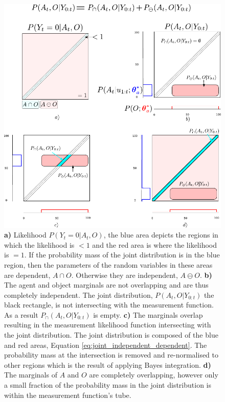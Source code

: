  \begin{figure}
 \centering
  \includegraphics[width=\textwidth]{./ch5-MLMF/Figures/Figure7.pdf}
  \caption{
  \textbf{a)} Likelihood $P(Y_t=0|A_t,O)$, the blue area depicts the regions in which the likelihood is $<1$ 
  and the red area is where the likelihood is $=1$. If the probability mass of the joint distribution 
  is in the blue region, then the parameters of the random variables in these areas are dependent, $A \cap O$.
  Otherwise they are independent, $A \ominus O$.  
   \textbf{b)} The agent and object marginals are not overlapping and are thus completely independent. The joint distribution, 
   $P(A_t,O|Y_{0:t})$ the black rectangle,  is not intersecting with the measurement function. As a result $P_{\cap}(A_t,O|Y_{0:t})$
   is empty.
 \textbf{c)} The marginals overlap resulting in the measurement likelihood function intersecting with the joint distribution.
 The joint distribution is composed of the blue and red areas, Equation \ref{eq:joint_independent_dependent}.
 The probability mass at the intersection is removed and re-normalised to other regions which is the result of applying Bayes integration. 
 \textbf{d)} The marginals of $A$ and $O$ are completely overlapping, however only a small fraction of the probability mass 
 in the joint distribution is within the measurement function's tube.}
  \label{fig:overlap_dependence_independence}
\end{figure}

